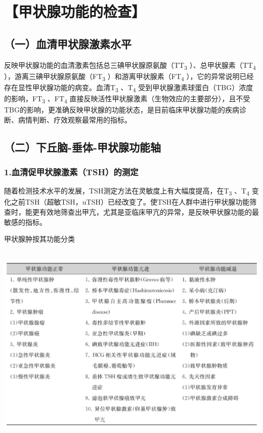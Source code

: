 \section{【甲状腺功能的检查】}

\subsection{（一）血清甲状腺激素水平}

反映甲状腺功能的血清激素包括总三碘甲状腺原氨酸（TT\textsubscript{3}
）、总甲状腺素（TT\textsubscript{4}
），游离三碘甲状腺原氨酸（FT\textsubscript{3}
）和游离甲状腺素（FT\textsubscript{4}
），它的异常说明已经存在显性甲状腺功能的病变。血清T\textsubscript{3}
、T\textsubscript{4}
受到甲状腺激素球蛋白（TBG）浓度的影响，FT\textsubscript{3}
、FT\textsubscript{4}
直接反映活性甲状腺激素（生物效应的主要部分），且不受TBG的影响，更准确反映甲状腺的功能状态，是目前临床甲状腺功能的疾病诊断、病情判断、疗效观察最常用的指标。

\subsection{（二）下丘脑-垂体-甲状腺功能轴}

\subsubsection{1.血清促甲状腺激素（TSH）的测定}

随着检测技术水平的发展，TSH测定方法在灵敏度上有大幅度提高，在T\textsubscript{3}
、T\textsubscript{4}
变化之前TSH（超敏TSH，uTSH）已经改变了。使TSH在人群中进行甲状腺功能筛查时，能更有效地筛查出甲亢，尤其是亚临床甲亢的异常，是反映甲状腺功能的最敏感的指标。

\begin{table}[htbp]
\centering
\caption{甲状腺肿按其功能分类}
\label{tab38-1}
\includegraphics[width=5.92708in,height=3.875in]{./images/Image00238.jpg}
\end{table}

